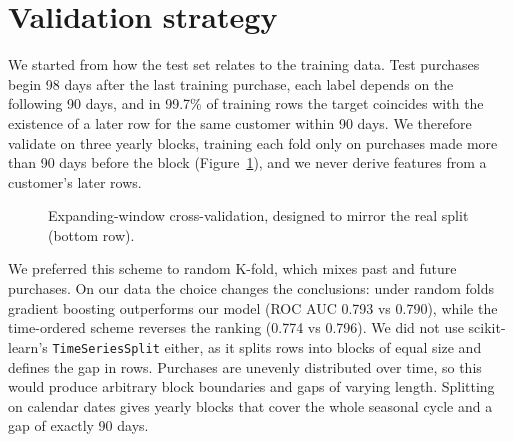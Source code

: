 \documentclass[10pt,a4paper]{article}
\begin{document}
\section{Validation strategy}

We started from how the test set relates to the training data. Test purchases begin 98 days after the last training purchase, each label depends on the following 90 days, and in 99.7\% of training rows the target coincides with the existence of a later row for the same customer within 90 days. We therefore validate on three yearly blocks, training each fold only on purchases made more than 90 days before the block (Figure~\ref{fig:cv}), and we never derive features from a customer's later rows.

\begin{figure}[h]
\centering
{}
\caption{Expanding-window cross-validation, designed to mirror the real split (bottom row).}\label{fig:cv}
\end{figure}

We preferred this scheme to random K-fold, which mixes past and future purchases. On our data the choice changes the conclusions: under random folds gradient boosting outperforms our model (ROC AUC 0.793 vs 0.790), while the time-ordered scheme reverses the ranking (0.774 vs 0.796). We did not use scikit-learn's \texttt{TimeSeriesSplit} either, as it splits rows into blocks of equal size and defines the gap in rows. Purchases are unevenly distributed over time, so this would produce arbitrary block boundaries and gaps of varying length. Splitting on calendar dates gives yearly blocks that cover the whole seasonal cycle and a gap of exactly 90 days.
\end{document}
